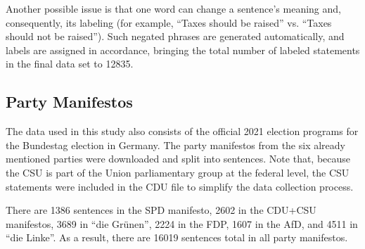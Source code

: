 Another possible issue is that one word can change a sentence's meaning and, consequently, its labeling (for example, ``Taxes should be raised'' vs. ``Taxes should not be raised''). Such negated phrases are generated automatically, and labels are assigned in accordance, bringing the total number of labeled statements in the final data set to 12835.

\subsection{Party Manifestos}

The data used in this study also consists of the official 2021 election programs for the Bundestag election in Germany. The party manifestos from the six already mentioned parties were downloaded and split into sentences. Note that, because the CSU is part of the Union parliamentary group at the federal level, the CSU statements were included in the CDU file to simplify the data collection process.

There are 1386 sentences in the SPD manifesto, 2602 in the CDU+CSU manifestos, 3689 in ``die Grünen'', 2224 in the FDP, 1607 in the AfD, and 4511 in ``die Linke''. As a result, there are 16019 sentences total in all party manifestos.
